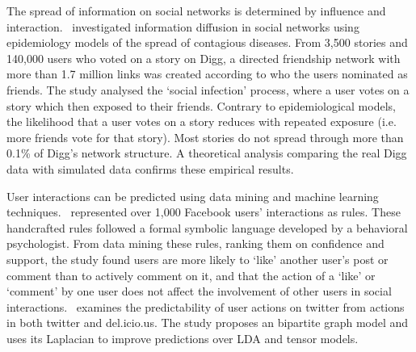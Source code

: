 \documentclass[letterpaper]{article}
\begin{document}
The spread of information on social networks is determined by influence and interaction.~\cite{ver2011stops} investigated information diffusion in social networks using epidemiology models of the spread of contagious diseases. From 3,500 stories and 140,000 users who voted on a story on Digg, a directed friendship network with more than 1.7 million links was created according to who the users nominated as friends. The study analysed the `social infection' process, where a user votes on a story which then exposed to their friends. Contrary to epidemiological models, the likelihood that a user votes on a story reduces with repeated exposure (i.e. more friends vote for that story). Most stories do not spread through more than 0.1\% of Digg’s network structure. A theoretical analysis comparing the real Digg data with simulated data confirms these empirical results.


User interactions can be predicted using data mining and machine learning techniques.~\cite{gomes2011social} represented over 1,000 Facebook users' interactions as rules. These handcrafted rules followed a formal symbolic language developed by a behavioral psychologist. From data mining these rules, ranking them on confidence and support, the study found users are more likely to `like' another user's post or comment than to actively comment on it, and that the action of a `like' or `comment' by one user does not affect the involvement of other users in social interactions.~\cite{nori2011exploiting} examines the predictability of user actions on twitter from actions in both twitter and del.icio.us. The study proposes an bipartite graph model and uses its Laplacian to improve predictions over LDA and tensor models.






\end{document}
